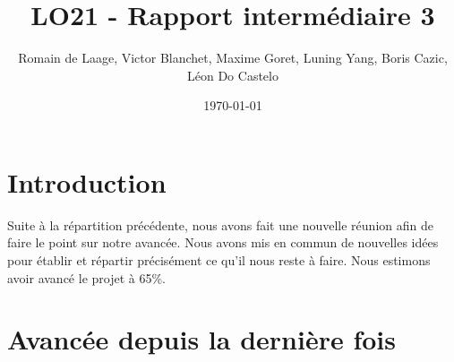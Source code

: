 \documentclass[11pt]{article}
\title{LO21 - Rapport intermédiaire 3}
\author{Romain de Laage, Victor Blanchet, Maxime Goret, Luning Yang, Boris Cazic, Léon Do Castelo}
\date{\today}
\begin{document}
\maketitle
\thispagestyle{fancy}

\section{Introduction}

Suite à la répartition précédente, nous avons fait une nouvelle réunion afin de faire le point sur notre avancée. Nous avons mis en commun de nouvelles idées pour établir et répartir précisément ce qu'il nous reste à faire. Nous estimons avoir avancé le projet à 65\%.

\section{Avancée depuis la dernière fois}
\end{document}
